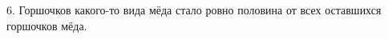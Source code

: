 6. Горшочков какого-то вида мёда стало ровно половина от всех оставшихся горшочков мёда.\newpage\noindent
